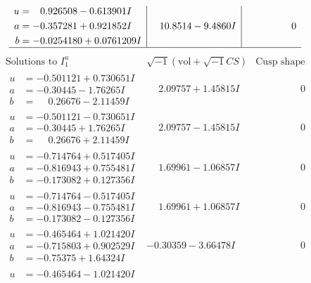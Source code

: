\documentclass[1p]{elsarticle_modified}
\theoremstyle{definition}
\newcommand{\I}{\sqrt{-1}}
\begin{document}
$$\begin{array}{c|c|c}
\begin{aligned}
u &= \phantom{-}0.926508 - 0.613901 I \\
a &= -0.357281 + 0.921852 I \\
b &= -0.0254180 + 0.0761209 I\end{aligned}
 & \phantom{-}10.8514 - 9.4860 I & \phantom{-0.000000 } 0\\
 \hline 
 \end{array}$$\newpage$$\begin{array}{c|c|c}  
\text{Solutions to }I^u_{1}& \I (\text{vol} + \sqrt{-1}CS) & \text{Cusp shape}\\
 \hline 
\begin{aligned}
u &= -0.501121 + 0.730651 I \\
a &= -0.30445 - 1.76265 I \\
b &= \phantom{-}0.26676 - 2.11459 I\end{aligned}
 & \phantom{-}2.09757 + 1.45815 I & \phantom{-0.000000 } 0 \\ \hline\begin{aligned}
u &= -0.501121 - 0.730651 I \\
a &= -0.30445 + 1.76265 I \\
b &= \phantom{-}0.26676 + 2.11459 I\end{aligned}
 & \phantom{-}2.09757 - 1.45815 I & \phantom{-0.000000 } 0 \\ \hline\begin{aligned}
u &= -0.714764 + 0.517405 I \\
a &= -0.816943 + 0.755481 I \\
b &= -0.173082 + 0.127356 I\end{aligned}
 & \phantom{-}1.69961 - 1.06857 I & \phantom{-0.000000 } 0 \\ \hline\begin{aligned}
u &= -0.714764 - 0.517405 I \\
a &= -0.816943 - 0.755481 I \\
b &= -0.173082 - 0.127356 I\end{aligned}
 & \phantom{-}1.69961 + 1.06857 I & \phantom{-0.000000 } 0 \\ \hline\begin{aligned}
u &= -0.465464 + 1.021420 I \\
a &= -0.715803 + 0.902529 I \\
b &= -0.75375 + 1.64324 I\end{aligned}
 & -0.30359 - 3.66478 I & \phantom{-0.000000 } 0 \\ \hline\begin{aligned}
u &= -0.465464 - 1.021420 I \\

\end{aligned}
\end{array}$$
\end{document}
